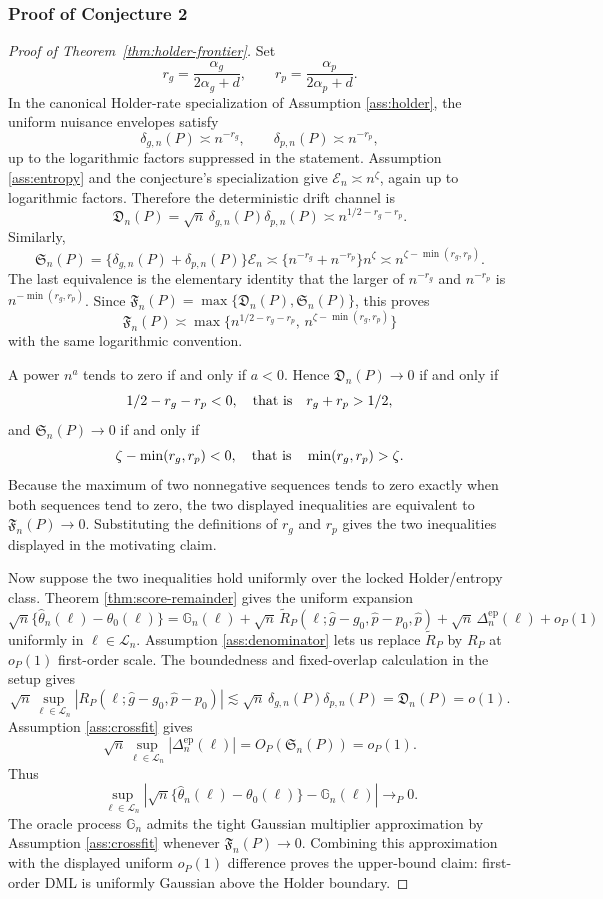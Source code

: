 \documentclass[11pt]{article}
\theoremstyle{definition}
\theoremstyle{plain}
\theoremstyle{remark}
\begin{document}
\subsubsection*{Proof of Conjecture 2}
\begin{proof}[Proof of Theorem~\ref{thm:holder-frontier}]
Set
\[
r_g=\frac{\alpha_g}{2\alpha_g+d},
\qquad
r_p=\frac{\alpha_p}{2\alpha_p+d}.
\]
In the canonical Holder-rate specialization of Assumption \ref{ass:holder},
the uniform nuisance envelopes satisfy
\[
\delta_{g,n}(P)\asymp n^{-r_g},
\qquad
\delta_{p,n}(P)\asymp n^{-r_p},
\]
up to the logarithmic factors suppressed in the statement.  Assumption
\ref{ass:entropy} and the conjecture's specialization give
\(\mathcal{E}_n\asymp n^\zeta\), again up to logarithmic factors.  Therefore
the deterministic drift channel is
\[
\mathfrak D_n(P)
=\sqrt n\,\delta_{g,n}(P)\delta_{p,n}(P)
\asymp
n^{1/2-r_g-r_p}.
\]
Similarly,
\[
\mathfrak S_n(P)
=\{\delta_{g,n}(P)+\delta_{p,n}(P)\}\mathcal{E}_n
\asymp
\{n^{-r_g}+n^{-r_p}\}n^\zeta
\asymp
n^{\zeta-\min(r_g,r_p)}.
\]
The last equivalence is the elementary identity that the larger of
\(n^{-r_g}\) and \(n^{-r_p}\) is \(n^{-\min(r_g,r_p)}\).  Since
\(\mathfrak F_n(P)=\max\{\mathfrak D_n(P),\mathfrak S_n(P)\}\), this proves
\[
\mathfrak F_n(P)\asymp
\max\{n^{1/2-r_g-r_p},\,n^{\zeta-\min(r_g,r_p)}\}
\]
with the same logarithmic convention.

A power \(n^a\) tends to zero if and only if \(a<0\).  Hence
\(\mathfrak D_n(P)\to0\) if and only if
\[
1/2-r_g-r_p<0,
\quad\hbox{that is}\quad
r_g+r_p>1/2,
\]
and \(\mathfrak S_n(P)\to0\) if and only if
\[
\zeta-\min(r_g,r_p)<0,
\quad\hbox{that is}\quad
\min(r_g,r_p)>\zeta.
\]
Because the maximum of two nonnegative sequences tends to zero exactly when
both sequences tend to zero, the two displayed inequalities are equivalent to
\(\mathfrak F_n(P)\to0\).  Substituting the definitions of \(r_g\) and \(r_p\)
gives the two inequalities displayed in the motivating claim.

Now suppose the two inequalities hold uniformly over the locked
Holder/entropy class.  Theorem \ref{thm:score-remainder} gives the uniform
expansion
\[
\sqrt n\{\hat\theta_n(\ell)-\theta_0(\ell)\}
=\mathbb G_n(\ell)
+\sqrt n\,\widetilde R_P(\ell;\hat g-g_0,\hat p-p_0,\hat p)
+\sqrt n\,\Delta_n^{\mathrm{ep}}(\ell)+o_P(1)
\]
uniformly in \(\ell\in\mathcal L_n\).  Assumption \ref{ass:denominator} lets
us replace \(\widetilde R_P\) by \(R_P\) at \(o_P(1)\) first-order scale.  The
boundedness and fixed-overlap calculation in the setup gives
\[
\sqrt n\sup_{\ell\in\mathcal L_n}|R_P(\ell;\hat g-g_0,\hat p-p_0)|
\lesssim
\sqrt n\,\delta_{g,n}(P)\delta_{p,n}(P)
=\mathfrak D_n(P)=o(1).
\]
Assumption \ref{ass:crossfit} gives
\[
\sqrt n\sup_{\ell\in\mathcal L_n}|\Delta_n^{\mathrm{ep}}(\ell)|
=O_P(\mathfrak S_n(P))=o_P(1).
\]
Thus
\[
\sup_{\ell\in\mathcal L_n}
\left|
\sqrt n\{\hat\theta_n(\ell)-\theta_0(\ell)\}-\mathbb G_n(\ell)
\right|
\to_P0.
\]
The oracle process \(\mathbb G_n\) admits the tight Gaussian multiplier
approximation by Assumption \ref{ass:crossfit} whenever
\(\mathfrak F_n(P)\to0\).  Combining this approximation with the displayed
uniform \(o_P(1)\) difference proves the upper-bound claim: first-order DML is
uniformly Gaussian above the Holder boundary.


\end{proof}
\end{document}
